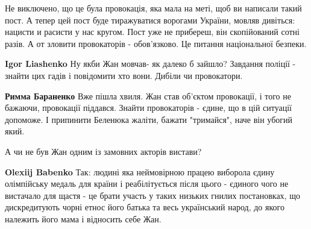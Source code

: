\begin{itemize}
Не виключено, що це була провокація, яка мала на меті, щоб ви написали такий
пост. А тепер цей пост буде тиражуватися ворогами України, мовляв дивіться:
нацисти и расисти у нас кругом. Пост уже не прибереш, він скопійований сотні
разів. А от зловити провокаторів - обов'язково. Це питання національної
безпеки.

\begin{itemize}
 
\textbf{Igor Liashenko} Ну якби Жан мовчав- як далеко б зайшло? Завдання поліції - знайти цих гадів і повідомити хто вони. Дибіли чи провокатори.

 
\textbf{Римма Бараненко} Вже пішла хвиля. Жан став об'єктом провокації, і того не бажаючи, провокації піддався. Знайти провокаторів - єдине, що в цій ситуації допоможе. І припинити Беленюка жаліти, бажати "тримайся", наче він убогий який.

 
А чи не був Жан одним із замовних акторів вистави?

 
\textbf{Olexiij Babenko} Так: людині яка неймовірною працею виборола єдину
олімпійську медаль для країни і реабілітується після цього - єдиного чого не
вистачало для щастя - це брати участь у таких низьких гнилих постановках, що
дискредитують чорні етнос його батька та весь український народ, до якого
належить його мама і відносить себе Жан.

 

\end{itemize}
\end{itemize}
